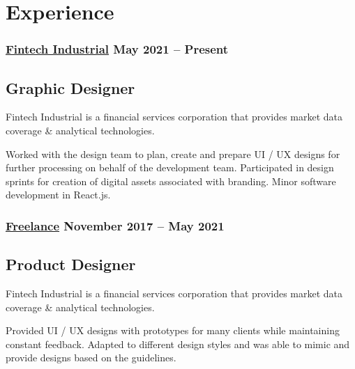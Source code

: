 \section*{Experience}
%
%
%
\subsubsection*{
  \href{https://www.linkedin.com/company/fintech-industrial/}{Fintech Industrial}
  \hspace*{\fill}
  May 2021 -- Present
}
\subsection*{Graphic Designer}
Fintech Industrial is a financial services corporation that provides market data coverage \& analytical technologies.
\smallskip
\begin{tasks}
  \task Worked with the design team to plan, create and prepare UI / UX designs for further processing on behalf of the development team.
  \task Participated in design sprints for creation of digital assets associated with branding.
  \task Minor software development in React.js.
\end{tasks}
%
%
\medskip
\subsubsection*{
  \href{https://bumbleboss.xyz/}{Freelance}
  \hspace*{\fill}
  November 2017 -- May 2021
}
\subsection*{Product Designer}
Fintech Industrial is a financial services corporation that provides market data coverage \& analytical technologies.
\smallskip
\begin{tasks}
  \task Provided UI / UX designs with prototypes for many clients while maintaining constant feedback. 
  \task Adapted to different design styles and was able to mimic and provide designs based on the guidelines.
\end{tasks}